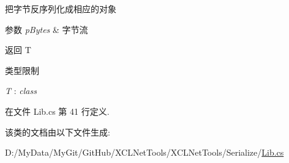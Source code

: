 把字节反序列化成相应的对象 


\begin{DoxyParams}{参数}
{\em p\-Bytes} & 字节流\\
\hline
\end{DoxyParams}
\begin{DoxyReturn}{返回}
T
\end{DoxyReturn}
\begin{Desc}
\item[类型限制]\begin{description}
\item[{\em T} : {\em class}]\end{description}
\end{Desc}


在文件 Lib.\-cs 第 41 行定义.



该类的文档由以下文件生成\-:\begin{DoxyCompactItemize}
\item 
D\-:/\-My\-Data/\-My\-Git/\-Git\-Hub/\-X\-C\-L\-Net\-Tools/\-X\-C\-L\-Net\-Tools/\-Serialize/\hyperlink{_serialize_2_lib_8cs}{Lib.\-cs}\end{DoxyCompactItemize}
